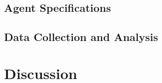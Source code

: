 \documentclass[12pt]{article}
\begin{document}
\subsection{Agent Specifications}

\subsection{Data Collection and Analysis}

\paragraph{}

\section{Discussion}

\newpage


\end{document}
